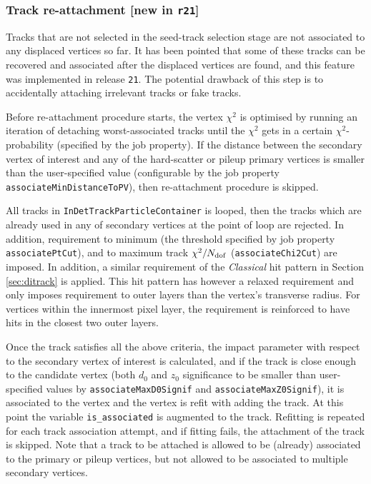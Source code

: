 \subsubsection{Track re-attachment [new in {\tt r21}]}
Tracks that are not selected in the seed-track selection stage are not associated to any displaced vertices so far. It has been pointed that some of these tracks can be recovered and associated after the displaced vertices are found, and this feature was implemented in release {\tt 21}. The potential drawback of this step is to accidentally attaching irrelevant tracks or fake tracks.

Before re-attachment procedure starts, the vertex $\chi^{2}$ is optimised by running an iteration of detaching worst-associated tracks until the $\chi^{2}$ gets in a certain $\chi^{2}$-probability (specified by the job property). If the distance between the secondary vertex of interest and any of the hard-scatter or pileup primary vertices is smaller than the user-specified value (configurable by the job property {\tt associateMinDistanceToPV}), then re-attachment procedure is skipped.

All tracks in {\tt InDetTrackParticleContainer} is looped, then the tracks which are already used in any of secondary vertices at the point of loop are rejected. In addition, requirement to minimum \pt (the threshold specified by job property {\tt associatePtCut}), and to maximum track $\chi^{2}/N_{\rm dof}$ ({\tt associateChi2Cut}) are imposed. In addition, a similar requirement of the \emph{Classical} hit pattern in Section \ref{sec:ditrack} is applied. This hit pattern has however a relaxed requirement and only imposes requirement to outer layers than the vertex's transverse radius. For vertices within the innermost pixel layer, the requirement is reinforced to have hits in the closest two outer layers.

Once the track satisfies all the above criteria, the impact parameter with respect to the secondary vertex of interest is calculated, and if the track is close enough to the candidate vertex (both $d_{0}$ and $z_{0}$ significance to be smaller than user-specified values by {\tt associateMaxD0Signif} and {\tt associateMaxZ0Signif}), it is associated to the vertex and the vertex is refit with adding the track. At this point the variable {\tt is\_associated} is augmented to the track. Refitting is repeated for each track association attempt, and if fitting fails, the attachment of the track is skipped. Note that a track to be attached is allowed to be (already) associated to the primary or pileup vertices, but not allowed to be associated to multiple secondary vertices.

